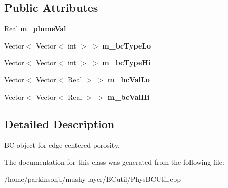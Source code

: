 \subsection*{Public Attributes}
\begin{DoxyCompactItemize}
\item 
\hypertarget{class_basic_porosity_permeability_face_b_c_function_aa1d072b0f7a83cee89f8c74800724f2f}{Real {\bfseries m\-\_\-plume\-Val}}\label{class_basic_porosity_permeability_face_b_c_function_aa1d072b0f7a83cee89f8c74800724f2f}

\item 
\hypertarget{class_basic_porosity_permeability_face_b_c_function_adf25634e67df48830f18ddd5c2aab692}{Vector$<$ Vector$<$ int $>$ $>$ {\bfseries m\-\_\-bc\-Type\-Lo}}\label{class_basic_porosity_permeability_face_b_c_function_adf25634e67df48830f18ddd5c2aab692}

\item 
\hypertarget{class_basic_porosity_permeability_face_b_c_function_a14bc35227bde0f362318c3089918d728}{Vector$<$ Vector$<$ int $>$ $>$ {\bfseries m\-\_\-bc\-Type\-Hi}}\label{class_basic_porosity_permeability_face_b_c_function_a14bc35227bde0f362318c3089918d728}

\item 
\hypertarget{class_basic_porosity_permeability_face_b_c_function_afb2fb410e5dbcd33748fd5085c2fb0d4}{Vector$<$ Vector$<$ Real $>$ $>$ {\bfseries m\-\_\-bc\-Val\-Lo}}\label{class_basic_porosity_permeability_face_b_c_function_afb2fb410e5dbcd33748fd5085c2fb0d4}

\item 
\hypertarget{class_basic_porosity_permeability_face_b_c_function_ae15db449a406cd36b5b2306eb5ef8aeb}{Vector$<$ Vector$<$ Real $>$ $>$ {\bfseries m\-\_\-bc\-Val\-Hi}}\label{class_basic_porosity_permeability_face_b_c_function_ae15db449a406cd36b5b2306eb5ef8aeb}

\end{DoxyCompactItemize}


\subsection{Detailed Description}
B\-C object for edge centered porosity. 

The documentation for this class was generated from the following file\-:\begin{DoxyCompactItemize}
\item 
/home/parkinsonjl/mushy-\/layer/\-B\-Cutil/Phys\-B\-C\-Util.\-cpp\end{DoxyCompactItemize}
